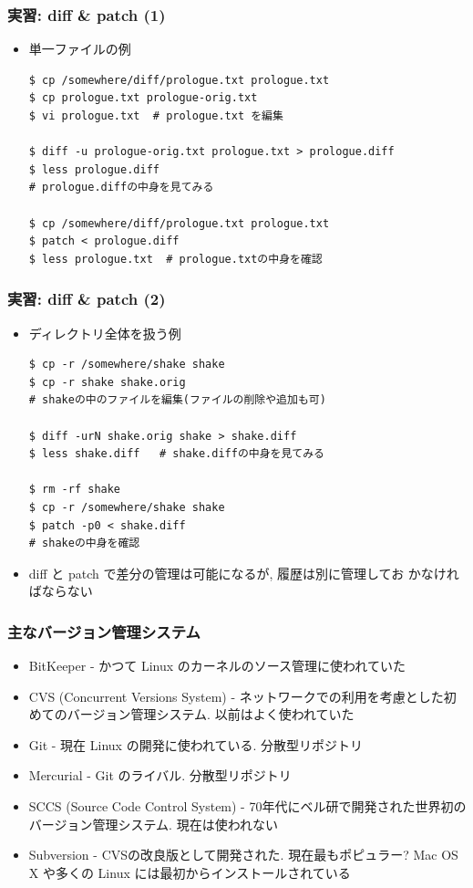 \begin{frame}[t,fragile]
  \frametitle{実習: diff \& patch (1)}
  \begin{itemize}
  \item 単一ファイルの例
\begin{lstlisting}
$ cp /somewhere/diff/prologue.txt prologue.txt
$ cp prologue.txt prologue-orig.txt
$ vi prologue.txt  # prologue.txt を編集

$ diff -u prologue-orig.txt prologue.txt > prologue.diff
$ less prologue.diff
# prologue.diffの中身を見てみる
  
$ cp /somewhere/diff/prologue.txt prologue.txt
$ patch < prologue.diff
$ less prologue.txt  # prologue.txtの中身を確認
\end{lstlisting}
  \end{itemize}
\end{frame}

\begin{frame}[t,fragile]
  \frametitle{実習: diff \& patch (2)}
  \begin{itemize}
  \item ディレクトリ全体を扱う例
\begin{lstlisting}
$ cp -r /somewhere/shake shake
$ cp -r shake shake.orig
# shakeの中のファイルを編集(ファイルの削除や追加も可)

$ diff -urN shake.orig shake > shake.diff
$ less shake.diff   # shake.diffの中身を見てみる

$ rm -rf shake
$ cp -r /somewhere/shake shake
$ patch -p0 < shake.diff
# shakeの中身を確認
\end{lstlisting}
  \item diff と patch で差分の管理は可能になるが, 履歴は別に管理してお
    かなければならない
  \end{itemize}
\end{frame}

\begin{frame}
  \frametitle{主なバージョン管理システム}
  \begin{itemize}
  \item BitKeeper - かつて Linux のカーネルのソース管理に使われていた
  \item CVS (Concurrent Versions System) - ネットワークでの利用を考慮とした初めてのバージョン管理システム. 以前はよく使われていた
  \item Git - 現在 Linux の開発に使われている. 分散型リポジトリ
  \item Mercurial - Git のライバル. 分散型リポジトリ
  \item SCCS (Source Code Control System) - 70年代にベル研で開発された世界初のバージョン管理システム. 現在は使われない
  \item Subversion - CVSの改良版として開発された. 現在最もポピュラー? Mac OS X や多くの Linux には最初からインストールされている
  \end{itemize}
\end{frame}


